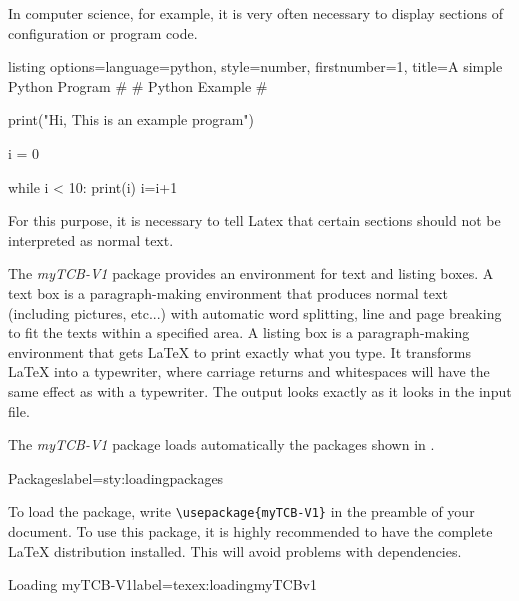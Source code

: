 \documentclass[]{myHOWTO-V001}
\begin{document}
In computer science, for example, it is very often necessary to display sections of configuration or program code.

\begin{myCODE}{listing options={language=python, style=number, firstnumber=1}, title={A simple Python Program}}
#
# Python Example
#

print("Hi, This is an example program")

i = 0

while i < 10:
	print(i)
	i=i+1
\end{myCODE}

For this purpose, it is necessary to tell Latex that certain sections should not be interpreted as normal text.

The \emph{myTCB-V1} package provides an environment for text and listing boxes. A text box is a paragraph-making environment that produces normal text (including pictures, etc...) with automatic
word splitting, line and page breaking to fit the texts within a specified area. A listing box is a paragraph-making environment that gets \LaTeX{} to print exactly what you type. It transforms \LaTeX{} into a typewriter, where carriage returns and whitespaces will have the same effect as with a typewriter. The output looks exactly as it looks in the input file.

\pagebreak

The \emph{myTCB-V1} package loads automatically the packages shown in .

\begin{mySTYdoclst}{Packages}{label={sty:loadingpackages}}
\RequirePackage{lipsum}

\RequirePackage{graphicx}
\RequirePackage{wrapfig}

\RequirePackage{xcolor}

\RequirePackage{verbatim}
\RequirePackage{fancyvrb}
\RequirePackage{listings}

\RequirePackage{float}

\RequirePackage{refstyle}

\RequirePackage{tcolorbox}
\end{mySTYdoclst}

To load the package, write \Verb|\usepackage{myTCB-V1}| in the preamble of your document. To use this package, it is highly recommended to have the complete \LaTeX{} distribution installed. This will avoid problems with dependencies.

\begin{myTEXEXdoclst}{Loading myTCB-V1}{label={texex:loadingmyTCBv1}}
\usepackage{myTCB-V1}
\end{myTEXEXdoclst}
\end{document}
